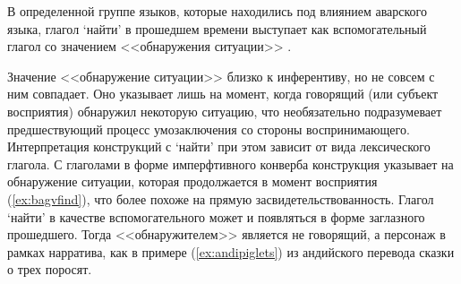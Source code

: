 В определенной группе языков, которые находились под влиянием аварского языка, глагол `найти' в прошедшем времени выступает как вспомогательный глагол со значением <<обнаружения ситуации>> \citep{danielmaisak2018}.


Значение <<обнаружение ситуации>> близко к инферентиву, но не совсем с ним совпадает. Оно указывает лишь на момент, когда говорящий (или субъект восприятия) обнаружил некоторую ситуацию, что необязательно подразумевает предшествующий процесс умозаключения со стороны воспринимающего. Интерпретация конструкций с `найти' при этом зависит от вида лексического глагола. С глаголами в форме имперфтивного конверба конструкция указывает на обнаружение ситуации, которая продолжается в момент восприятия (\ref{ex:bagvfind}), что более похоже на прямую засвидетельствованность. Глагол `найти' в качестве вспомогательного может и появляться в форме заглазного прошедшего. Тогда <<обнаружителем>> является не говорящий, а персонаж в рамках нарратива, как в примере (\ref{ex:andipiglets}) из андийского перевода сказки о трех поросят.




